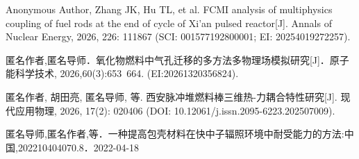 \begin{achievelist}
    \item Anonymous Author, Zhang JK, Hu TL, et al. FCMI analysis of multiphysics coupling of fuel rods at the end of cycle of Xi’an pulsed reactor[J]. Annals of Nuclear Energy, 2026, 226: 111867 (SCI: 001577192800001; EI: 20254019272257).
    \item 匿名作者,匿名导师．氧化物燃料中气孔迁移的多方法多物理场模拟研究[J]．原子能科学技术, 2026,60(3):653~664. (EI:20261320356824).
    \item 匿名作者, 胡田亮, 匿名导师, 等. 西安脉冲堆燃料棒三维热-力耦合特性研究[J]. 现代应用物理, 2026, 17(2): 020406 (DOI: 10.12061/j.issn.2095-6223.202507009).
    \item 匿名导师,匿名作者,等．一种提高包壳材料在快中子辐照环境中耐受能力的方法:中国,202210404070.8\allowbreak [P]．2022-04-18
\end{achievelist}